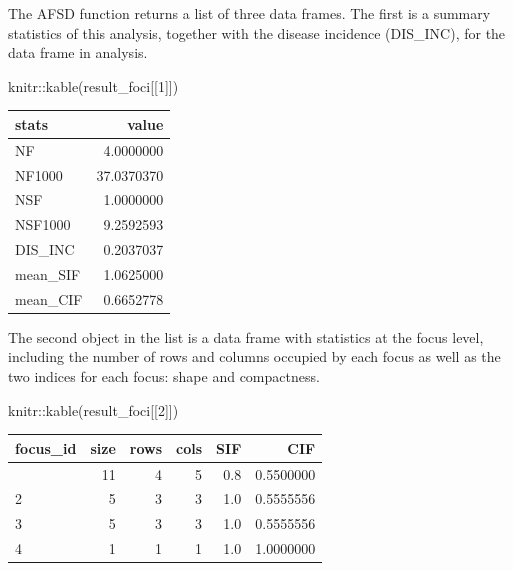 \documentclass[
  letterpaper,
]{book}
\newenvironment{Shaded}{\begin{snugshade}}{\end{snugshade}}
\newcommand{\DecValTok}[1]{\textcolor[rgb]{0.68,0.00,0.00}{#1}}
\newcommand{\FunctionTok}[1]{\textcolor[rgb]{0.28,0.35,0.67}{#1}}
\newcommand{\NormalTok}[1]{\textcolor[rgb]{0.00,0.23,0.31}{#1}}
\newcommand{\SpecialCharTok}[1]{\textcolor[rgb]{0.37,0.37,0.37}{#1}}
\begin{document}
The AFSD function returns a list of three data frames. The first is a
summary statistics of this analysis, together with the disease incidence
(DIS\_INC), for the data frame in analysis.

\begin{Shaded}
\begin{Highlighting}[]
\NormalTok{knitr}\SpecialCharTok{::}\FunctionTok{kable}\NormalTok{(result\_foci[[}\DecValTok{1}\NormalTok{]])}
\end{Highlighting}
\end{Shaded}

\begin{longtable}[]{@{}lr@{}}
\toprule\noalign{}
stats & value \\
\midrule\noalign{}
\endhead
\bottomrule\noalign{}
\endlastfoot
NF & 4.0000000 \\
NF1000 & 37.0370370 \\
NSF & 1.0000000 \\
NSF1000 & 9.2592593 \\
DIS\_INC & 0.2037037 \\
mean\_SIF & 1.0625000 \\
mean\_CIF & 0.6652778 \\
\end{longtable}

The second object in the list is a data frame with statistics at the
focus level, including the number of rows and columns occupied by each
focus as well as the two indices for each focus: shape and compactness.

\begin{Shaded}
\begin{Highlighting}[]
\NormalTok{knitr}\SpecialCharTok{::}\FunctionTok{kable}\NormalTok{(result\_foci[[}\DecValTok{2}\NormalTok{]])}
\end{Highlighting}
\end{Shaded}

\begin{longtable}[]{@{}lrrrrr@{}}
\toprule\noalign{}
focus\_id & size & rows & cols & SIF & CIF \\
\midrule\noalign{}
\endhead
\bottomrule\noalign{}
\endlastfoot
1 & 11 & 4 & 5 & 0.8 & 0.5500000 \\
2 & 5 & 3 & 3 & 1.0 & 0.5555556 \\
3 & 5 & 3 & 3 & 1.0 & 0.5555556 \\
4 & 1 & 1 & 1 & 1.0 & 1.0000000 \\
\end{longtable}
\end{document}
